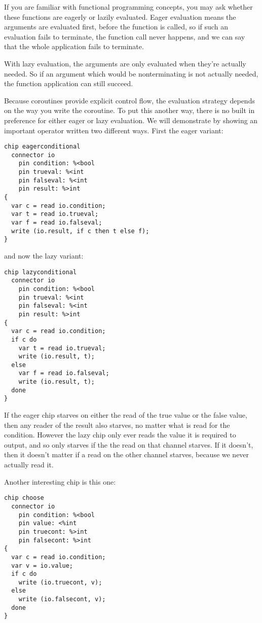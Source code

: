 \documentclass[oneside]{book}
\begin{document}
If you are familiar with functional programming concepts, you may
ask whether these functions are eagerly or lazily evaluated.
Eager evaluation means the arguments are evaluated first,
before the function is called, so if such an evaluation fails
to terminate, the function call never happens, and we can say that
the whole application fails to terminate.

With lazy evaluation, the arguments are only evaluated when they're
actually needed. So if an argument which would be nonterminating
is not actually needed, the function application can still succeed.

Because coroutines provide explicit control flow, the evaluation
strategy depends on the way you write the coroutine. To put this
another way, there is no built in preference for either eager or
lazy evaluation. We will demonstrate by showing an important
operator written two different ways. First the eager variant:

\begin{verbatim}
chip eagerconditional
  connector io
    pin condition: %<bool
    pin trueval: %<int
    pin falseval: %<int
    pin result: %>int
{
  var c = read io.condition;
  var t = read io.trueval;
  var f = read io.falseval;
  write (io.result, if c then t else f);
}
\end{verbatim}

and now the lazy variant:

\begin{verbatim}
chip lazyconditional
  connector io
    pin condition: %<bool
    pin trueval: %<int
    pin falseval: %<int
    pin result: %>int
{
  var c = read io.condition;
  if c do
    var t = read io.trueval;
    write (io.result, t);
  else 
    var f = read io.falseval;
    write (io.result, t);
  done
}
\end{verbatim}

If the eager chip starves on either the read of the true value
or the false value, then any reader of the result also starves,
no matter what is read for the condition. However the lazy
chip only ever reads the value it is required to output,
and so only starves if the the read on that channel starves.
If it doesn't, then it doesn't matter if a read on the
other channel starves, because we never actually read it.

Another interesting chip is this one:

\begin{verbatim}
chip choose
  connector io
    pin condition: %<bool
    pin value: <%int
    pin truecont: %>int
    pin falsecont: %>int
{
  var c = read io.condition;
  var v = io.value;
  if c do
    write (io.truecont, v);
  else
    write (io.falsecont, v);
  done
}
\end{verbatim}
\end{document}
